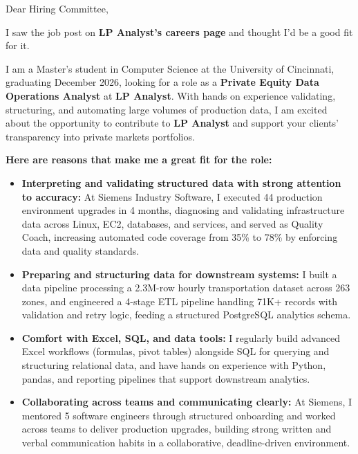 \documentclass[11pt]{letter}
\date{}
\begin{document}
\begin{letter}{}

\opening{Dear Hiring Committee,}

I saw the job post on \textbf{LP Analyst's careers page} and thought I'd be a good fit for it.

I am a Master's student in Computer Science at the University of Cincinnati, graduating December 2026, looking for a role as a \textbf{Private Equity Data Operations Analyst} at \textbf{LP Analyst}. With hands on experience validating, structuring, and automating large volumes of production data, I am excited about the opportunity to contribute to \textbf{LP Analyst} and support your clients' transparency into private markets portfolios.

\textbf{Here are reasons that make me a great fit for the role:}

\begin{itemize}[leftmargin=*, itemsep=0.45em]
    \item \textbf{Interpreting and validating structured data with strong attention to accuracy:} At Siemens Industry Software, I executed 44 production environment upgrades in 4 months, diagnosing and validating infrastructure data across Linux, EC2, databases, and services, and served as Quality Coach, increasing automated code coverage from 35\% to 78\% by enforcing data and quality standards.

    \item \textbf{Preparing and structuring data for downstream systems:} I built a data pipeline processing a 2.3M-row hourly transportation dataset across 263 zones, and engineered a 4-stage ETL pipeline handling 71K+ records with validation and retry logic, feeding a structured PostgreSQL analytics schema.

    \item \textbf{Comfort with Excel, SQL, and data tools:} I regularly build advanced Excel workflows (formulas, pivot tables) alongside SQL for querying and structuring relational data, and have hands on experience with Python, pandas, and reporting pipelines that support downstream analytics.

    \item \textbf{Collaborating across teams and communicating clearly:} At Siemens, I mentored 5 software engineers through structured onboarding and worked across teams to deliver production upgrades, building strong written and verbal communication habits in a collaborative, deadline-driven environment.
\end{itemize}


\end{letter}
\end{document}
